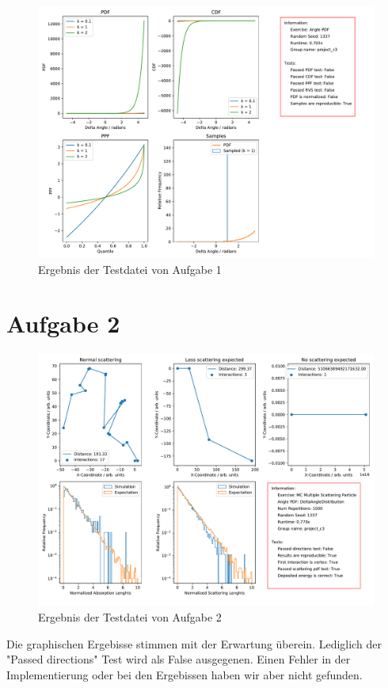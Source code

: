 \documentclass[11pt,a4paper]{article}
\begin{document}
\begin{figure}[h]

	\centering

	\includegraphics[width=\textwidth]{exercise_angle_pdf.pdf}

	\caption{Ergebnis der Testdatei von Aufgabe 1}

\end{figure}

\section*{Aufgabe 2}

\begin{figure}[h]

	\centering

	\includegraphics[width=\textwidth]{exercise_mc_multiple_scattering.pdf}

	\caption{Ergebnis der Testdatei von Aufgabe 2}

\end{figure}

Die graphischen Ergebisse stimmen mit der Erwartung überein. 
Lediglich der "Passed directions" Test wird als False ausgegenen.
Einen Fehler in der Implementierung oder bei den Ergebissen haben wir aber nicht gefunden.
\end{document}
